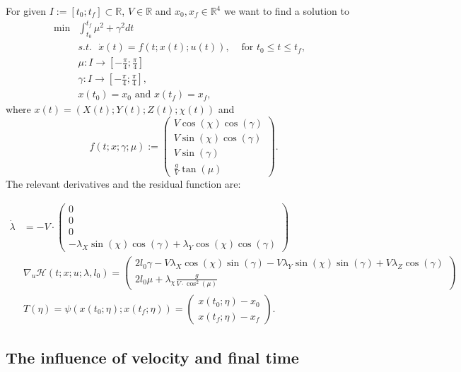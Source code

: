 \documentclass[a4paper]{article}
\theoremstyle{definitions}
\theoremstyle{bemerkung}
\theoremstyle{satz}
\theoremstyle{satz}
\begin{document}
    For given $I:=[t_0;t_f]\subset \mathbb{R}$, $V \in \mathbb{R}$ and $x_0,x_f \in \mathbb{R}^4$ we want to find a solution to
    \begin{align*}
    \min &\int_{t_0}^{t_f}\mu^2 + \gamma^2 dt\\
        & s.t. \text{ } \dot{x}(t) = f(t;x(t);u(t)), & \text{ for } t_0\leq t \leq t_f,\\
        &  \mu: I \to [-\frac{\pi}{4}; \frac{\pi}{4}] &  & \\
        & \gamma: I\to [-\frac{\pi}{4}; \frac{\pi}{4}], &  & \\
        & x(t_0) = x_0 \text{ and } x(t_f) = x_f, & &
\end{align*}
where $x(t) = (X(t);Y(t);Z(t);\chi(t))$ and 
\[
    f(t;x;\gamma;\mu) := \begin{pmatrix}
        V \cos(\chi) \cos(\gamma) \\
        V \sin(\chi) \cos(\gamma) \\
        V \sin(\gamma) \\
        \frac{g}{V} \tan({\mu})
    \end{pmatrix}.
\]
The relevant derivatives and the residual function are:

\begin{align*}
    \dot{\lambda} &= -V\cdot\begin{pmatrix}
        0\\
        0\\
        0\\
        -\lambda_X \sin(\chi)\cos(\gamma)+\lambda_Y\cos(\chi)\cos(\gamma)
    \end{pmatrix}\\
    &\nabla_u \mathcal{H}(t;x;u;\lambda, l_0) =\begin{pmatrix}
            2l_0\gamma-V\lambda_X \cos(\chi)\sin(\gamma) - V \lambda_Y \sin(\chi)\sin(\gamma)+V\lambda_Z \cos(\gamma)\\
            2l_0\mu+\lambda_{\chi} \frac{g}{V\cdot \cos^2(\mu)}
    \end{pmatrix}\\
    &T(\eta) = \psi(x(t_0; \eta); x(t_f;\eta)) = \begin{pmatrix}
        x(t_0; \eta) -x_0\\
        x(t_f;\eta) - x_f
    \end{pmatrix}    .
\end{align*}

\subsection{The influence of velocity and final time}
\end{document}
